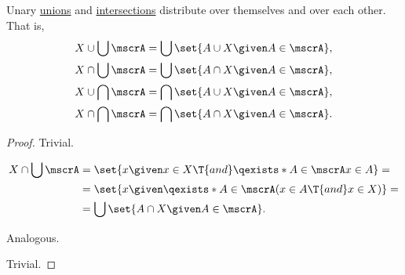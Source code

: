 \begin{proposition}\label{thm:union_intersection_distributivity}
  Unary \hyperref[def:set_union/unary]{unions} and \hyperref[def:set_intersection/unary]{intersections} distribute over themselves and over each other. That is,
  \begin{align}
    X \cup \bigcup \mscrA &= \bigcup \set{ A \cup X \given A \in \mscrA }, \label{eq:thm:union_intersection_distributivity/union_over_union} \\
    X \cap \bigcup \mscrA &= \bigcup \set{ A \cap X \given A \in \mscrA }, \label{eq:thm:union_intersection_distributivity/intersection_over_union} \\
    X \cup \bigcap \mscrA &= \bigcap \set{ A \cup X \given A \in \mscrA }, \label{eq:thm:union_intersection_distributivity/union_over_intersection} \\
    X \cap \bigcap \mscrA &= \bigcap \set{ A \cap X \given A \in \mscrA }. \label{eq:thm:union_intersection_distributivity/intersection_over_intersection}
  \end{align}
\end{proposition}
\begin{proof}
   Trivial.

  \begin{align*}
    X \cap \bigcup \mscrA
    &=
    \set{ x \given x \in X \T{and} \qexists*{A \in \mscrA} x \in A }
    = \\ &=
    \set{ x \given \qexists*{A \in \mscrA} (x \in A \T{and} x \in X) }
    = \\ &=
    \bigcup \set{ A \cap X \given A \in \mscrA }.
  \end{align*}

   Analogous.

   Trivial.
\end{proof}


